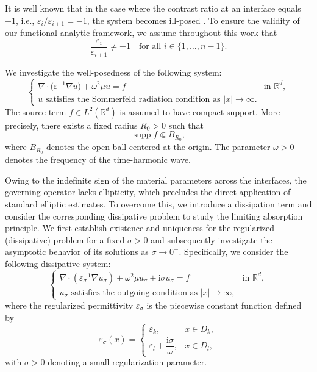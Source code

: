 \documentclass[12pt,reqno]{amsart}
\numberwithin{equation}{section}
\begin{document}
It is well known that in the case where the contrast ratio at an interface equals $-1$, i.e., $\varepsilon_i / \varepsilon_{i+1} = -1$, the system becomes ill-posed \cite{MR3200087, MR2263683}. To ensure the validity of our functional-analytic framework, we assume throughout this work that
\begin{equation*}
    \frac{\varepsilon_i}{\varepsilon_{i+1}} \neq -1 \quad \text{for all } i \in \{1, \dots, n-1\}.
\end{equation*}





We investigate the well-posedness of the following system:
\begin{equation}\label{eq11}
\begin{cases}
\nabla \cdot \big(\varepsilon^{-1} \nabla u\big) + \omega^2 \mu u = f & \text{in } \mathbb{R}^d,\\[1mm]
u \text{ satisfies the Sommerfeld radiation condition as } |x| \to \infty.
\end{cases}
\end{equation}
The source term \(f\in L^2(\mathbb{R}^d)\) is assumed to have compact support. More precisely, there exists a fixed radius \(R_0>0\) such that
\[
\operatorname{supp} f \Subset B_{R_0},
\]
where \(B_{R_0}\) denotes the open ball centered at the origin. The parameter \(\omega>0\) denotes the frequency of the time-harmonic wave.

	
Owing to the indefinite sign of the material parameters across the interfaces, the governing operator lacks ellipticity, which precludes the direct application of standard elliptic estimates. To overcome this, we introduce a dissipation term and consider the corresponding dissipative problem to study the limiting absorption principle. We first establish existence and uniqueness for the regularized (dissipative) problem for a fixed $\sigma > 0$ and subsequently investigate the asymptotic behavior of its solutions as $\sigma \to 0^+$. Specifically, we consider the following dissipative system:
\begin{equation}\label{eq10}
\begin{cases}
\nabla \cdot (\varepsilon^{-1}_\sigma \nabla u_\sigma) + \omega^2 \mu u_\sigma + \mathrm{i}\sigma u_\sigma = f & \text{in } \mathbb{R}^d,\\[3pt]
u_\sigma \text{ satisfies the outgoing condition as } |x| \to \infty,
\end{cases}
\end{equation}
where the regularized permittivity $\varepsilon_\sigma$ is the piecewise constant function defined by
\[
\varepsilon_\sigma(x) =
\begin{cases}
\varepsilon_k, & x \in D_k,\\
\varepsilon_l + \dfrac{\mathrm{i}\sigma}{\omega}, & x \in D_l,
\end{cases}
\]
with $\sigma > 0$ denoting a small regularization parameter.
\end{document}

